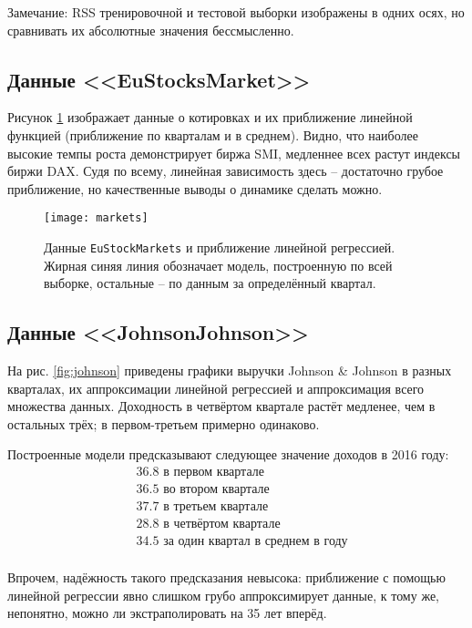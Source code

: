 \documentclass[a4paper,12pt]{article} %
\begin{document}
Замечание: RSS тренировочной и тестовой выборки изображены в одних осях, но сравнивать их абсолютные значения бессмысленно.

\newpage
\subsection{Данные <<EuStocksMarket>>}

Рисунок \ref{fig:markets} изображает данные о котировках и их приближение линейной функцией (приближение по кварталам и в среднем).
Видно, что наиболее высокие темпы роста демонстрирует биржа SMI, медленнее всех растут индексы биржи DAX. Судя по всему, линейная зависимость здесь -- достаточно грубое приближение, но качественные выводы о динамике сделать можно.

\begin{figure}[H]
    \centering \texttt{[image: markets]}
    \caption{Данные \texttt{EuStockMarkets} и приближение линейной регрессией. Жирная синяя линия обозначает модель, построенную по всей выборке, остальные -- по данным за определённый квартал. }
    \label{fig:markets}
\end{figure}

\newpage
\subsection{Данные <<JohnsonJohnson>>}

На рис. \ref{fig:johnson} приведены графики выручки Johnson \& Johnson в разных кварталах, их аппроксимации линейной регрессией и аппроксимация всего множества данных.
Доходность в четвёртом квартале растёт медленее, чем в остальных трёх; в первом-третьем примерно одинаково.

Построенные модели предсказывают следующее значение доходов в 2016 году:
\begin{align*}
    & 36.8 \text{ в первом квартале} \\
    & 36.5 \text{ во втором квартале} \\
    & 37.7 \text{ в третьем квартале} \\
    & 28.8 \text{ в четвёртом квартале} \\
    & 34.5 \text{ за один квартал в среднем в году} \\
\end{align*}

Впрочем, надёжность такого предсказания невысока: приближение с помощью линейной регрессии явно слишком грубо аппроксимирует данные, к тому же, непонятно, можно ли экстраполировать на 35 лет вперёд.
\end{document}
